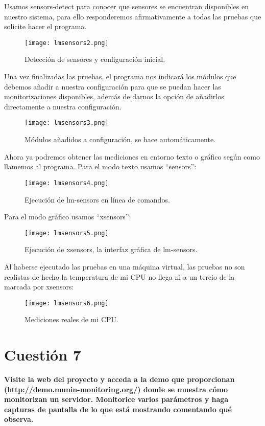 \documentclass[a4paper, 11pt]{article} %
\begin{document}
\pagebreak

Usamos sensors-detect para conocer que sensores se encuentran disponibles en nuestro sistema, para ello responderemos afirmativamente a todas las pruebas que solicite hacer el programa.
\begin{figure}[H]
\centering 
\texttt{[image: lmsensors2.png]} 
\caption{Detección de sensores y configuración inicial.} 
\label{contexto:figura} 
\end{figure}

Una vez finalizadas las pruebas, el programa nos indicará los módulos que debemos añadir a nuestra configuración para que se puedan hacer las monitorizaciones disponibles, además de darnos la opción de añadirlos directamente a nuestra configuración.
\begin{figure}[H]
\centering 
\texttt{[image: lmsensors3.png]} 
\caption{Módulos añadidos a configuración, se hace automáticamente.} 
\label{contexto:figura} 
\end{figure}

\pagebreak

Ahora ya podremos obtener las mediciones en entorno texto o gráfico según como llamemos al programa. Para el modo texto usamos “sensors”:
\begin{figure}[H]
\centering 
\texttt{[image: lmsensors4.png]} 
\caption{Ejecución de lm-sensors en línea de comandos.} 
\label{contexto:figura} 
\end{figure}

Para el modo gráfico usamos “xsensors”:
\begin{figure}[H]
\centering 
\texttt{[image: lmsensors5.png]} 
\caption{Ejecución de xsensors, la interfaz gráfica de lm-sensors.} 
\label{contexto:figura} 
\end{figure}

Al haberse ejecutado las pruebas en una máquina virtual, las pruebas no son realistas de hecho la temperatura de mi CPU no llega ni a un tercio de la marcada por xsensors:
\begin{figure}[H]
\centering 
\texttt{[image: lmsensors6.png]} 
\caption{Mediciones reales de mi CPU.} 
\label{contexto:figura} 
\end{figure}

\pagebreak

\section{Cuestión 7}
\textbf{Visite la web del proyecto y acceda a la demo que proporcionan (\url{http://demo.munin-monitoring.org/}) donde se muestra cómo monitorizan un servidor. Monitorice varios parámetros y haga capturas de pantalla de lo que está mostrando comentando qué observa.}\\
\end{document}
